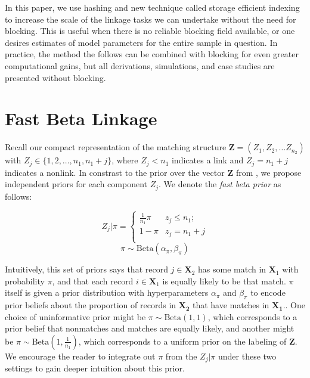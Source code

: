 \documentclass[12pt,letterpaper]{article}
\newcommand{\1}[1]{\mathbb{I}\!\left[#1\right]} %
\begin{document}
In this paper, we use hashing and new technique called storage efficient indexing to increase the scale of the linkage tasks we can undertake without the need for blocking. This is useful when there is no reliable blocking field available, or one desires estimates of model parameters for the entire sample in question. In practice, the method the follows can be combined with blocking for even greater computational gains, but all derivations, simulations, and case studies are presented without blocking. 

\section{Fast Beta Linkage}
\label{sec:fast-beta-linkage}

Recall our compact representation of the matching structure $\bm{Z} = (Z_1, Z_2, \ldots Z_{n_2})$ with $Z_j \in \{1,2, \ldots, n_1, n_1 + j\}$, where $Z_j < n_1$ indicates a link and $Z_j = n_1 + j$ indicates a nonlink. In constrast to the prior over the vector $\bm{Z}$ from \cite{sadinle_bayesian_2017}, we propose independent priors for each component $Z_j$. We denote the \emph{fast beta prior} as follows:


$$Z_j | \pi =
\begin{cases} 
	\frac{1}{n_1}\pi  & z_j \leq n_1; \\
	1-\pi &  z_j  = n_1 + j \\
\end{cases}$$
$$\pi \sim \text{Beta}(\alpha_{\pi}, \beta_{\pi})$$


Intuitively, this set of priors says that record $j \in \bm{X}_2$ has some match in $\bm{X}_1$ with probability $\pi$, and that each record $i \in \bm{X}_1$ is equally likely to be that match. $\pi$ itself is given a prior distribution with hyperparameters $\alpha_{\pi}$ and $\beta_{\pi}$ to encode prior beliefs about  the proportion of records in $\bm{X_2}$ that have matches in $\bm{X_1}$.. One choice of uninformative prior might be \(\pi \sim \text{Beta}(1, 1)\), which corresponds to a prior belief that nonmatches and matches are equally likely, and another might be \(\pi \sim \text{Beta}\left(1, \frac{1}{n_1}\right)\), which corresponds to a uniform prior on the labeling of \(\mathbf{Z}\). We encourage the reader to integrate out $\pi$ from the $Z_j|\pi$ under these two settings to gain deeper intuition about this prior. 
\end{document}
